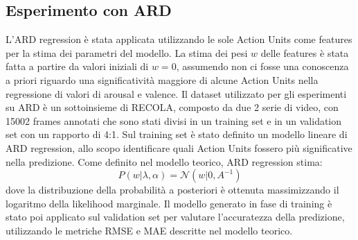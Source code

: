 \documentclass[10pt,journal,compsoc]{IEEEtran}
\begin{document}
\subsection{Esperimento con ARD}
L’ARD regression è stata applicata utilizzando le sole Action Units come features per la stima dei parametri del modello.
La stima dei pesi \(w\) delle features  è stata fatta a partire da valori iniziali di \(w = 0\), assumendo non ci fosse una conoscenza a priori riguardo una significatività maggiore  di alcune Action Units nella regressione di valori di arousal e valence. Il dataset utilizzato per gli esperimenti su ARD è un sottoinsieme di RECOLA, composto da due 2 serie di video, con 15002 frames annotati che sono stati divisi in un training set e in un validation set con un rapporto di 4:1.
Sul training set è stato definito un modello lineare di ARD regression, allo scopo identificare quali Action Units fossero più significative nella predizione.
Come definito nel modello teorico, ARD regression stima:
\[P(w|\lambda,\alpha) = \mathcal{N}(w|0,A^{-1})\]
dove la distribuzione della probabilità a posteriori è ottenuta massimizzando il logaritmo della likelihood marginale. Il modello generato in fase di training è stato poi applicato sul validation set per valutare l'accuratezza della predizione, utilizzando le metriche RMSE e MAE descritte nel modello teorico.
\end{document}
